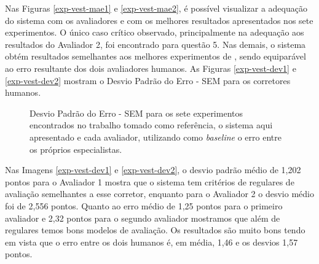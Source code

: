 Nas Figuras \ref{exp-vest-mae1} e \ref{exp-vest-mae2}, é possível visualizar a adequação do sistema com os avaliadores e com os melhores resultados apresentados nos sete experimentos. O único caso crítico observado, principalmente na adequação aos resultados do Avaliador 2, foi encontrado para questão 5. Nas demais, o sistema obtém resultados semelhantes aos melhores experimentos de \cite{pissinati2014-master}, sendo equiparável ao erro resultante dos dois avaliadores humanos. As Figuras \ref{exp-vest-dev1} e \ref{exp-vest-dev2} mostram o Desvio Padrão do Erro - SEM para os corretores humanos.

\begin{figure}[ht]
\centering
{}

\caption{Desvio Padrão do Erro - SEM para os sete experimentos encontrados no trabalho tomado como referência, o sistema aqui apresentado e cada avaliador, utilizando como \textit{baseline} o erro entre os próprios especialistas.}
\end{figure}

Nas Imagens \ref{exp-vest-dev1} e \ref{exp-vest-dev2}, o desvio padrão médio de 1,202 pontos para o Avaliador 1 mostra que o sistema tem critérios de regulares de avaliação semelhantes a esse corretor, enquanto para o Avaliador 2 o desvio médio foi de 2,556 pontos. Quanto ao erro médio de 1,25 pontos para o primeiro avaliador e 2,32 pontos para o segundo avaliador mostramos que além de regulares temos bons modelos de avaliação. Os resultados são muito bons tendo em vista que o erro entre os dois humanos é, em média, 1,46 e os desvios 1,57 pontos.

